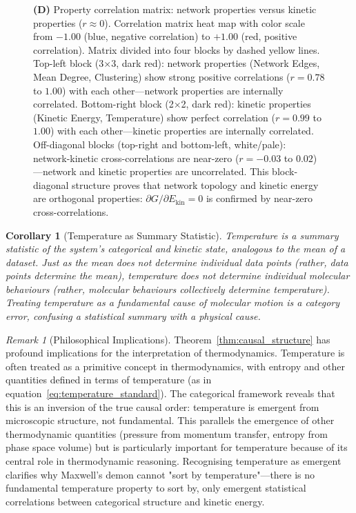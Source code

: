 \documentclass[12pt,a4paper]{article}
\newtheorem{corollary}[theorem]{Corollary}
\theoremstyle{definition}
\theoremstyle{remark}
\newtheorem{remark}[theorem]{Remark}
\begin{document}
\begin{figure}[htbp]
{\textbf{(D)} Property correlation matrix: network properties versus kinetic properties ($r \approx 0$). Correlation matrix heat map with color scale from $-1.00$ (blue, negative correlation) to $+1.00$ (red, positive correlation). Matrix divided into four blocks by dashed yellow lines. Top-left block (3×3, dark red): network properties (Network Edges, Mean Degree, Clustering) show strong positive correlations ($r = 0.78$ to $1.00$) with each other—network properties are internally correlated. Bottom-right block (2×2, dark red): kinetic properties (Kinetic Energy, Temperature) show perfect correlation ($r = 0.99$ to $1.00$) with each other—kinetic properties are internally correlated. Off-diagonal blocks (top-right and bottom-left, white/pale): network-kinetic cross-correlations are near-zero ($r = -0.03$ to $0.02$)—network and kinetic properties are uncorrelated. This block-diagonal structure proves that network topology and kinetic energy are orthogonal properties: $\partial G/\partial E_{\text{kin}} = 0$ is confirmed by near-zero cross-correlations.}
\label{fig:arg2_temperature_independence_v1}
\end{figure}


\begin{corollary}[Temperature as Summary Statistic]
\label{cor:temperature_summary}
Temperature is a summary statistic of the system's categorical and kinetic state, analogous to the mean of a dataset. Just as the mean does not determine individual data points (rather, data points determine the mean), temperature does not determine individual molecular behaviours (rather, molecular behaviours collectively determine temperature). Treating temperature as a fundamental cause of molecular motion is a category error, confusing a statistical summary with a physical cause.
\end{corollary}

\begin{remark}[Philosophical Implications]
\label{rem:philosophical}
Theorem~\ref{thm:causal_structure} has profound implications for the interpretation of thermodynamics. Temperature is often treated as a primitive concept in thermodynamics, with entropy and other quantities defined in terms of temperature (as in equation~\eqref{eq:temperature_standard}). The categorical framework reveals that this is an inversion of the true causal order: temperature is emergent from microscopic structure, not fundamental. This parallels the emergence of other thermodynamic quantities (pressure from momentum transfer, entropy from phase space volume) but is particularly important for temperature because of its central role in thermodynamic reasoning. Recognising temperature as emergent clarifies why Maxwell's demon cannot "sort by temperature"—there is no fundamental temperature property to sort by, only emergent statistical correlations between categorical structure and kinetic energy.
\end{remark}
\end{document}
